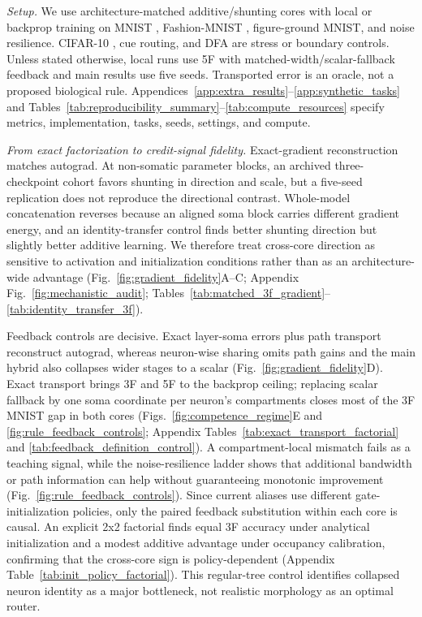     \noindent\emph{Setup.}
    We use architecture-matched additive/shunting cores with local or backprop training on MNIST \cite{lecun1998gradient}, Fashion-MNIST \cite{xiao2017fashionmnist}, figure-ground MNIST, and noise resilience. CIFAR-10 \cite{krizhevsky2009learning}, cue routing, and DFA are stress or boundary controls. Unless stated otherwise, local runs use 5F with matched-width/scalar-fallback feedback and main results use five seeds. Transported error is an oracle, not a proposed biological rule. Appendices~\ref{app:extra_results}--\ref{app:synthetic_tasks} and Tables~\ref{tab:reproducibility_summary}--\ref{tab:compute_resources} specify metrics, implementation, tasks, seeds, settings, and compute.
    
    \noindent\emph{From exact factorization to credit-signal fidelity.}
    Exact-gradient reconstruction matches autograd. At non-somatic parameter blocks, an archived three-checkpoint cohort favors shunting in direction and scale, but a five-seed replication does not reproduce the directional contrast. Whole-model concatenation reverses because an aligned soma block carries different gradient energy, and an identity-transfer control finds better shunting direction but slightly better additive learning. We therefore treat cross-core direction as sensitive to activation and initialization conditions rather than as an architecture-wide advantage (Fig.~\ref{fig:gradient_fidelity}A--C; Appendix Fig.~\ref{fig:mechanistic_audit}; Tables~\ref{tab:matched_3f_gradient}--\ref{tab:identity_transfer_3f}).

    Feedback controls are decisive. Exact layer-soma errors plus path transport reconstruct autograd, whereas neuron-wise sharing omits path gains and the main hybrid also collapses wider stages to a scalar (Fig.~\ref{fig:gradient_fidelity}D). Exact transport brings 3F and 5F to the backprop ceiling; replacing scalar fallback by one soma coordinate per neuron's compartments closes most of the 3F MNIST gap in both cores (Figs.~\ref{fig:competence_regime}E and \ref{fig:rule_feedback_controls}; Appendix Tables~\ref{tab:exact_transport_factorial} and \ref{tab:feedback_definition_control}). A compartment-local mismatch fails as a teaching signal, while the noise-resilience ladder shows that additional bandwidth or path information can help without guaranteeing monotonic improvement (Fig.~\ref{fig:rule_feedback_controls}). Since current aliases use different gate-initialization policies, only the paired feedback substitution within each core is causal. An explicit 2x2 factorial finds equal 3F accuracy under analytical initialization and a modest additive advantage under occupancy calibration, confirming that the cross-core sign is policy-dependent (Appendix Table~\ref{tab:init_policy_factorial}). This regular-tree control identifies collapsed neuron identity as a major bottleneck, not realistic morphology as an optimal router.
    
